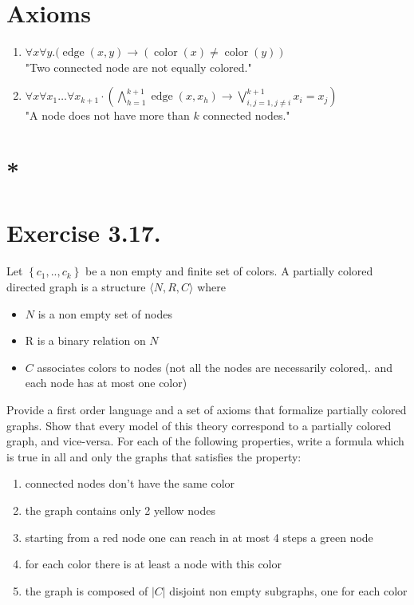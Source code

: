 \documentclass[10pt]{article}
\begin{document}
\section{Axioms}
\begin{enumerate}
  \item $\forall x \forall y .(\operatorname{edge}(x, y) \rightarrow(\operatorname{color}(x) \neq \operatorname{color}(y))$\\
"Two connected node are not equally colored."
  \item $\forall x \forall x_{1} \ldots \forall x_{k+1} \cdot\left(\bigwedge_{h=1}^{k+1} \operatorname{edge}\left(x, x_{h}\right) \rightarrow \bigvee_{i, j=1, j \neq i}^{k+1} x_{i}=x_{j}\right)$\\
"A node does not have more than $k$ connected nodes."
\end{enumerate}

\section{*}
\section{Exercise 3.17.}
Let $\left\{c_{1}, . ., c_{k}\right\}$ be a non empty and finite set of colors. A partially colored directed graph is a structure $\langle N, R, C\rangle$ where

\begin{itemize}
  \item $N$ is a non empty set of nodes
  \item R is a binary relation on $N$
  \item $C$ associates colors to nodes (not all the nodes are necessarily colored,. and each node has at most one color)
\end{itemize}

Provide a first order language and a set of axioms that formalize partially colored graphs. Show that every model of this theory correspond to a partially colored graph, and vice-versa. For each of the following properties, write a formula which is true in all and only the graphs that satisfies the property:

\begin{enumerate}
  \item connected nodes don't have the same color
  \item the graph contains only 2 yellow nodes
  \item starting from a red node one can reach in at most 4 steps a green node
  \item for each color there is at least a node with this color
  \item the graph is composed of $|C|$ disjoint non empty subgraphs, one for each color
\end{enumerate}
\end{document}
